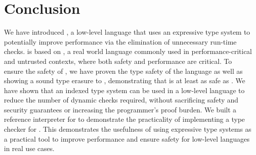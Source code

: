 \chapter{Conclusion}
\label{chp:conclusion}
We have introduced \name, a low-level language that uses an expressive type system to potentially improve performance via the elimination of unnecessary run-time checks.
\name is based on \wasm, a real world language commonly used in performance-critical and untrusted contexts, where both safety and performance are critical.
To ensure the safety of \name, we have proven the type safety of the \name language as well as showing a sound type erasure to \wasm, demonstrating that \name is at least as safe as \wasm.
We have shown that an indexed type system can be used in a low-level language to reduce the number of dynamic checks required, without sacrificing safety and security guarantees or increasing the programmer's proof burden.
We built a reference interpreter for \name to demonstrate the practicality of implementing a type checker for \name.
This demonstrates the usefulness of using expressive type systems as a practical tool to improve performance and ensure safety for low-level languages in real use cases.
